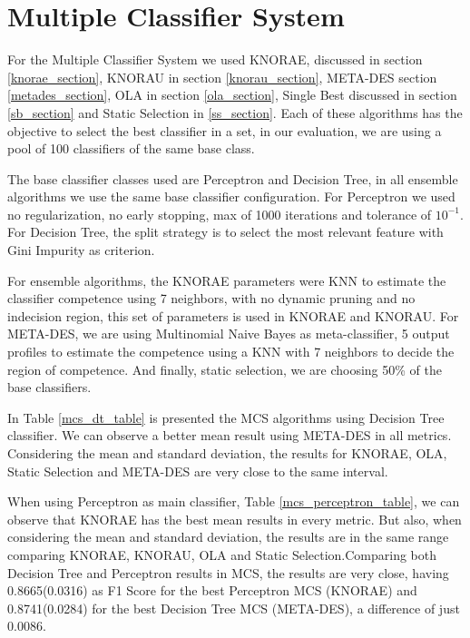 \section{Multiple Classifier System}\label{mcs}

For the Multiple Classifier System we used KNORAE, discussed in section \ref{knorae_section}, KNORAU in section \ref{knorau_section}, META-DES section \ref{metades_section}, OLA in section \ref{ola_section}, Single Best discussed in section \ref{sb_section} and Static Selection in \ref{ss_section}. Each of these algorithms has the objective to select the best classifier in a set, in our evaluation, we are using a pool of 100 classifiers of the same base class.

The base classifier classes used are Perceptron and Decision Tree, in all ensemble algorithms we use the same base classifier configuration. For Perceptron we used no regularization, no early stopping, max of 1000 iterations and tolerance of $10^{-1}$. For Decision Tree, the split strategy is to select the most relevant feature with Gini Impurity as criterion.

For ensemble algorithms, the KNORAE parameters were KNN to estimate the classifier competence using 7 neighbors, with no dynamic pruning and no indecision region, this set of parameters is used in KNORAE and KNORAU. For META-DES, we are using Multinomial Naive Bayes as meta-classifier, 5 output profiles to estimate the competence using a KNN with 7 neighbors to decide the region of competence. And finally, static selection, we are choosing 50\% of the base classifiers.

In Table \ref{mcs_dt_table} is presented the MCS algorithms using Decision Tree classifier. We can observe a better mean result using META-DES in all metrics. Considering the mean and standard deviation, the results for KNORAE, OLA, Static Selection and META-DES are very close to the same interval.

When using Perceptron as main classifier, Table \ref{mcs_perceptron_table}, we can observe that KNORAE has the best mean results in every metric. But also, when considering the mean and standard deviation, the results are in the same range comparing KNORAE, KNORAU, OLA and Static Selection.Comparing both Decision Tree and Perceptron results in MCS, the results are very close, having 0.8665(0.0316) as F1 Score for the best Perceptron MCS (KNORAE) and 0.8741(0.0284) for the best Decision Tree MCS (META-DES), a difference of just 0.0086.


